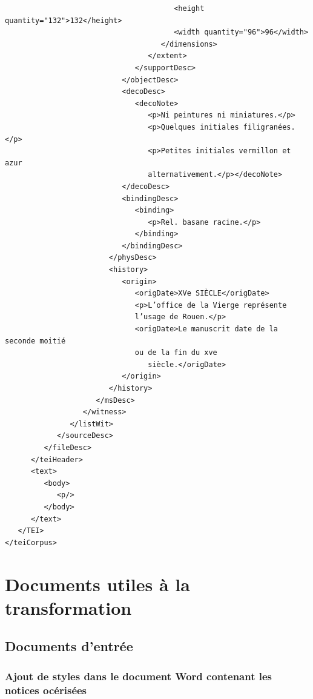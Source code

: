 \documentclass[a4paper,12pt,twoside]{book}
\begin{document}
\begin{verbatim}
                                       <height quantity="132">132</height>
                                       <width quantity="96">96</width>
                                    </dimensions>
                                 </extent>
                              </supportDesc>
                           </objectDesc>
                           <decoDesc>
                              <decoNote>
                                 <p>Ni peintures ni miniatures.</p>
                                 <p>Quelques initiales filigranées.</p>
                                 <p>Petites initiales vermillon et azur
                                 alternativement.</p></decoNote>
                           </decoDesc>
                           <bindingDesc>
                              <binding>
                                 <p>Rel. basane racine.</p>
                              </binding>
                           </bindingDesc>
                        </physDesc>
                        <history>
                           <origin>
                              <origDate>XVe SIÈCLE</origDate>
                              <p>L’office de la Vierge représente 
                              l’usage de Rouen.</p>
                              <origDate>Le manuscrit date de la seconde moitié 
                              ou de la fin du xve
                                 siècle.</origDate>
                           </origin>
                        </history>
                     </msDesc>
                  </witness>
               </listWit>
            </sourceDesc>
         </fileDesc>
      </teiHeader>
      <text>
         <body>
            <p/>
         </body>
      </text>
   </TEI>
</teiCorpus>
	\end{verbatim}
	
	
	\section{Documents utiles à la transformation}
	
	\subsection{Documents d'entrée}
	
	\subsubsection{\label{styles_word}Ajout de styles dans le document Word contenant les notices océrisées}
	
\end{document}
